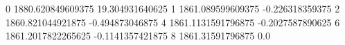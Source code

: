 0 1880.620849609375 19.304931640625
1 1861.089599609375 -0.226318359375
2 1860.821044921875 -0.494873046875
4 1861.1131591796875 -0.2027587890625
6 1861.2017822265625 -0.1141357421875
8 1861.31591796875 0.0
